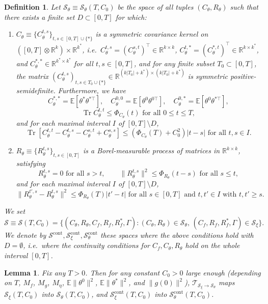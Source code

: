 \documentclass[10pt,a4paper]{amsart}
\newtheorem{defi}{Definition}
\newtheorem{lem}{Lemma}
\def\Ct{C_\theta}
\def\E{\mathbb{E}}
\def\R{\mathbb{R}}
\def\Rt{R_\theta}
\def\Tr{\operatorname{Tr}}
\def\cS{\mathcal{S}}
\def\pCt{\Phi_{\Ct}}
\def\pRt{\Phi_{\Rt}}
\def\trsfrmA{\mathcal{T}_{\mathcal{S}_\xi \to {\mathcal{S}}_\theta}}
\begin{document}
\begin{defi}
Let ${\mathcal{S}}_\theta \equiv {\mathcal{S}}_\theta(T,C_0)$ be the space of
all tuples $(C_\theta,R_\theta)$ such that there exists a finite set $D \subset [0,T]$
for which:
    \begin{enumerate}
        \item $\Ct \equiv \{\Ct^{t,s}\}_{t,s \in [0,T] \cup \{*\}}$ is a symmetric
covariance kernel on $([0,T] \otimes \R^k) \times \R^{k^*}$, i.e.\
$\Ct^{t,s}=(\Ct^{s,t})^\top \in \R^{k \times k}$,
$\Ct^{t,*}=(\Ct^{*,t})^\top \in \R^{k \times k^*}$, and
$\Ct^{*,*} \in \R^{k^* \times k^*}$ for all $t,s \in [0,T]$, and
for any finite subset $T_0 \subset [0,T]$,
the matrix $(\Ct^{t,s})_{t,s \in T_0 \cup \{*\}} \in \R^{(k|T_0|+k^*) \times
(k|T_0|+k^*)}$ is symmetric positive-semidefinite. Furthermore,
we have
\[\Ct^{*,*}=\E[\theta^*\theta^{*\top}],
\quad \Ct^{0,0}=\E[\theta^0\theta^{0\top}],
\quad \Ct^{0,*}=\E[\theta^0\theta^{*\top}],\]
\[\Tr \Ct^{t,t} \leq \pCt(t) \text{ for all } 0\leq t\leq T,\]
and for each maximal interval $I$ of $[0,T]\setminus D$,
        \begin{equation}\label{eq:Cthetacontinuity}
            \Tr[\Ct^{t,t}-\Ct^{t,s}-\Ct^{s,t}+\Ct^{s,s}] \leq 
(\Phi_{C_\theta}(T)+C_0^2)|t-s|
\text{ for all } t,s \in I.
        \end{equation}
        \item $\Rt \equiv \{\Rt^{t,s}\}_{t,s \in [0,T]}$ is a Borel-measurable
process of matrices in $\R^{k \times k}$, satisfying
\[\Rt^{t,s}=0 \text{ for all $s>t$},
\qquad
\|\Rt^{t,s}\|^2 \leq \pRt(t-s) \text{ for all } s \leq t,\]
and for each maximal interval $I$ of $[0,T] \setminus D$,
\[\|\Rt^{t',s}-\Rt^{t,s}\|^2 \leq \Phi_{R_\theta}(T)|t'-t|
\text{ for all } s \in [0,T] \text{ and }
t,t' \in I \text{ with } t,t' \geq s.\]
\end{enumerate}
We set
\[\cS \equiv \cS(T,C_0)=\{(C_\theta,R_\theta,C_f,R_f,R_f^*,\Gamma):
(C_\theta,R_\theta) \in \cS_\theta,\,(C_f,R_f,R_f^*,\Gamma) \in \cS_\xi\}.\]
We denote by
$\cS^{\mathrm{cont}},\cS_\xi^{\mathrm{cont}},\cS_\theta^{\mathrm{cont}}$
these spaces where the above conditions hold with $D=\emptyset$,
i.e.\ where the continuity conditions for
$C_f,C_\theta,R_\theta$ hold on the whole interval $[0,T]$. 
\end{defi}

\begin{lem} \label{lem:solution-in-space}
Fix any $T>0$. Then for any constant $C_0>0$ large enough (depending on $T$,
$M_f$, $M_g$, $M_\eta$, $\E\|\theta^0\|^2$, $\E\|\theta^*\|^2$, and
$\|g(0)\|^2$),
$\trsfrmA$ maps $\mathcal{S}_\xi(T,C_0)$ into ${\mathcal{S}}_\theta(T,C_0)$, and
$\mathcal{S}^{\mathrm{cont}}_\xi(T,C_0)$ into
${\mathcal{S}}^{\mathrm{cont}}_\theta(T,C_0)$.
\end{lem}
\end{document}
